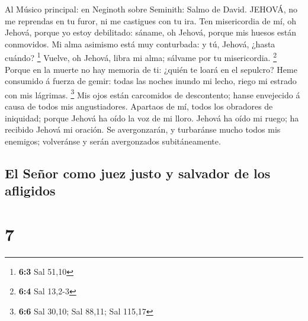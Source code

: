  Al Músico principal: en Neginoth sobre Seminith: Salmo de
David. JEHOVÁ, no me reprendas en tu furor, ni me castigues con tu ira.
 Ten misericordia de mí, oh Jehová, porque yo estoy
debilitado: sáname, oh Jehová, porque mis huesos están conmovidos.
 Mi alma asimismo está muy conturbada: y tú, Jehová, ¿hasta
cuándo? \footnote{\textbf{6:3} Sal 51,10}  Vuelve, oh
Jehová, libra mi alma; sálvame por tu misericordia. \footnote{\textbf{6:4}
  Sal 13,2-3}  Porque en la muerte no hay memoria de ti:
¿quién te loará en el sepulcro?  Heme consumido á fuerza de
gemir: todas las noches inundo mi lecho, riego mi estrado con mis
lágrimas. \footnote{\textbf{6:6} Sal 30,10; Sal 88,11; Sal 115,17}
 Mis ojos están carcomidos de descontento; hanse envejecido
á causa de todos mis angustiadores.  Apartaos de mí, todos
los obradores de iniquidad; porque Jehová ha oído la voz de mi lloro.
 Jehová ha oído mi ruego; ha recibido Jehová mi oración.
 Se avergonzarán, y turbaránse mucho todos mis enemigos;
volveránse y serán avergonzados subitáneamente.

\hypertarget{el-seuxf1or-como-juez-justo-y-salvador-de-los-afligidos}{%
\subsection{El Señor como juez justo y salvador de los
afligidos}\label{el-seuxf1or-como-juez-justo-y-salvador-de-los-afligidos}}

\hypertarget{section-6}{%
\section{7}\label{section-6}}

